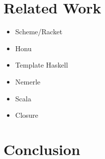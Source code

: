 \documentclass[preprint,10pt]{sigplanconf}
\begin{document}
\section{Related Work}
\label{sec-7}

\begin{itemize}
\item Scheme/Racket
\item Honu
\item Template Haskell
\item Nemerle
\item Scala
\item Closure
\end{itemize}
\section{Conclusion}
\label{sec-8}
\end{document}
